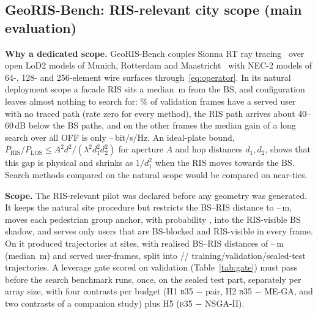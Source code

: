 \documentclass[runningheads]{llncs}
\newcommand{\bts}{\textsc{b35}}
\begin{document}
\subsection{GeoRIS-Bench: RIS-relevant city scope (main evaluation)}
\textbf{Why a dedicated scope.} GeoRIS-Bench couples Sionna RT ray tracing~\cite{hoydis2023sionna} over open LoD2 models of Munich, Rotterdam and Maastricht~\cite{bavaria2025lod2,peters2022automated,ledoux2019cityjson,ahn4} with NEC-2 models of 64-, 128- and 256-element wire surfaces through~\eqref{eq:operator}. In its natural deployment scope a facade RIS sits a median \,m from the BS, and configuration leaves almost nothing to search for: \% of validation frames have a served user with no traced path (rate zero for every method), the RIS path arrives about 40--60\,dB below the BS paths, and on the other frames the median gain of a long search over all OFF is only --\,bit/s/Hz. An ideal-plate bound, $P_{\mathrm{RIS}}/P_{\mathrm{LOS}}\le A^2d^2/(\lambda^2d_1^2d_2^2)$ for aperture $A$ and hop distances $d_1,d_2$, shows that this gap is physical and shrinks as $1/d_1^2$ when the RIS moves towards the BS. Search methods compared on the natural scope would be compared on near-ties.

\textbf{Scope.} The RIS-relevant pilot was declared before any geometry was generated. It keeps the natural site procedure but restricts the BS--RIS distance to --\,m, moves each pedestrian group anchor, with probability , into the RIS-visible BS shadow, and serves only users that are BS-blocked and RIS-visible in every frame. On  it produced  trajectories at  sites, with realised BS--RIS distances of --\,m (median \,m) and  served user-frames, split into // training/validation/sealed-test trajectories. A leverage gate scored on validation (Table~\ref{tab:gate}) must pass before the search benchmark runs, once, on the sealed test part, separately per array size, with four contrasts per budget (H1 \bts{} $-$ pair, H2 \bts{} $-$ ME-GA, and two contrasts of a companion study) plus H5 (\bts{} $-$ NSGA-II).
\end{document}
